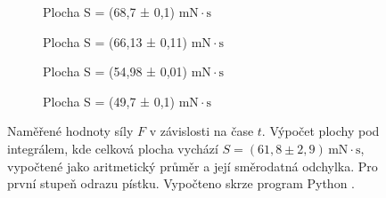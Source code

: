 \begin{figure}[H]
    \vspace{0.5em}
\begin{subfigure}[t]{0.3\textwidth}
            \centering
            
            \caption{
                Plocha S = (68,7 ± 0,1) $\mathrm{mN \cdot s}$
            }
            \label{fig:integrales-1g}
        \end{subfigure}%
    \hfill
\begin{subfigure}[t]{0.3\textwidth}
            \centering
            
            \caption{
                Plocha S = (66,13 ± 0,11) $\mathrm{mN \cdot s}$
            }
            \label{fig:integrales-1h}
        \end{subfigure}%
    \hfill
\begin{subfigure}[t]{0.3\textwidth}
            \centering
            
            \caption{
                Plocha S = (54,98 ± 0,01) $\mathrm{mN \cdot s}$
            }
            \label{fig:integrales-1i}
        \end{subfigure}

    \vspace{0.5em}
\begin{subfigure}[t]{0.3\textwidth}
            \centering
            
            \caption{
                Plocha S = (49,7 ± 0,1) $\mathrm{mN \cdot s}$
            }
            \label{fig:integrales-1j}
        \end{subfigure}

        \caption{
            Naměřené hodnoty síly $F$ v závislosti na čase $t$. Výpočet plochy pod integrálem, kde celková plocha vychází $S=(61,8 \pm 2,9)\,\mathrm{mN\cdot s}$, vypočtené jako aritmetický průměr a její směrodatná odchylka. Pro první stupeň odrazu pístku. Vypočteno skrze program Python \cite{GitHubMAT}.
        }
        \label{fig:integrales-1}
    \end{figure}
    